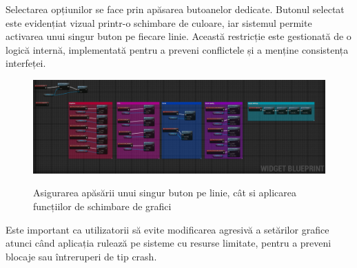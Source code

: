 Selectarea opțiunilor se face prin apăsarea butoanelor dedicate. Butonul selectat este evidențiat vizual printr-o schimbare de culoare, iar sistemul permite activarea unui singur buton pe fiecare linie. Această restricție este gestionată de o logică internă, implementată pentru a preveni conflictele și a menține consistența interfeței.

\begin{figure} [htp] 
\centering 
\includegraphics [width=14cm]
{continut/capitol3/figuri/Settings_graph.png} 
\label{fig:Menu}  
    \caption{Asigurarea apăsării unui singur buton pe linie, cât si aplicarea funcțiilor de schimbare de grafici}
\end{figure}

Este important ca utilizatorii să evite modificarea agresivă a setărilor grafice atunci când aplicația rulează pe sisteme cu resurse limitate, pentru a preveni blocaje sau întreruperi de tip crash.

